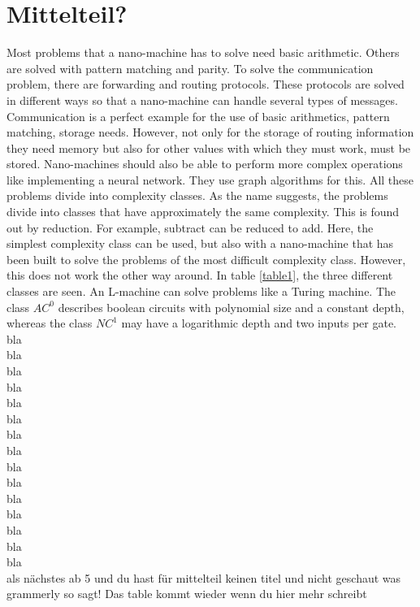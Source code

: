 \documentclass[10pt,sigconf]{acmart}
\begin{document}
\section{Mittelteil?}
Most problems that a nano-machine has to solve need basic arithmetic.
Others are solved with pattern matching and parity.
To solve the communication problem, there are forwarding and routing protocols. 
These protocols are solved in different ways so that a nano-machine can handle several types of messages.
Communication is a perfect example for the use of basic arithmetics, pattern matching, storage needs.
However, not only for the storage of routing information they need memory but also for other values with which they must work, must be stored.
Nano-machines should also be able to perform more complex operations like implementing a neural network.
They use graph algorithms for this. 
All these problems divide into complexity classes.
As the name suggests, the problems divide into classes that have approximately the same complexity.
This is found out by reduction. For example, subtract can be reduced to add. 
Here, the simplest complexity class can be used, but also with a nano-machine that has been built to solve the problems of the most difficult complexity class.
However, this does not work the other way around.
In table \ref{table1}, the three different classes are seen.
An L-machine can solve problems like a Turing machine.
The class $AC^0$ describes boolean circuits with polynomial size and a constant depth, whereas the class $NC^1$ may have a logarithmic depth and two inputs per gate. 
\\
bla\\
bla\\bla\\
bla\\
bla\\bla\\
bla\\
bla\\bla\\
bla\\
bla\\bla\\
bla\\
bla\\bla\\
als nächstes ab 5 und du hast für mittelteil keinen titel und nicht geschaut was grammerly so sagt!
Das table kommt wieder wenn du hier mehr schreibt\\
\end{document}
